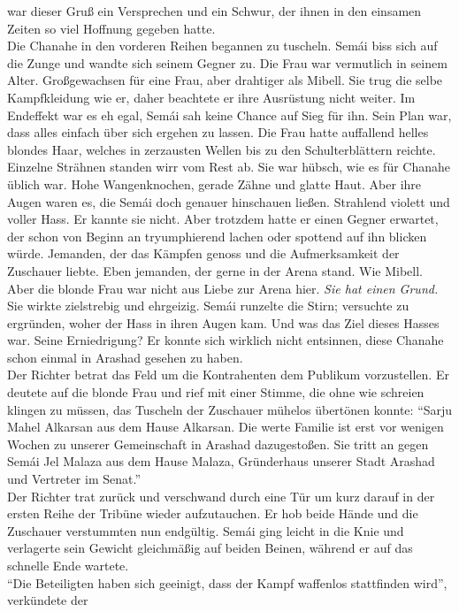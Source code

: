 war dieser Gruß ein Versprechen und ein Schwur, der ihnen in den einsamen Zeiten so viel Hoffnung 
gegeben hatte. \\
Die Chanahe in den vorderen Reihen begannen zu tuscheln. Semái biss sich auf die Zunge und wandte 
sich seinem Gegner zu. Die Frau war vermutlich in seinem Alter. Großgewachsen für eine Frau, aber 
drahtiger als Mibell. Sie trug die selbe Kampfkleidung wie er, daher beachtete er ihre Ausrüstung 
nicht weiter. Im Endeffekt war es eh egal, Semái sah keine Chance auf Sieg für ihn. Sein Plan war, 
dass alles einfach über sich ergehen zu lassen. Die Frau hatte auffallend helles blondes Haar, 
welches in zerzausten Wellen bis zu den Schulterblättern reichte. Einzelne Strähnen standen wirr 
vom Rest ab. Sie war hübsch, wie es für Chanahe üblich war. Hohe Wangenknochen, gerade Zähne und 
glatte Haut. Aber ihre Augen waren es, die Semái doch genauer hinschauen ließen. Strahlend violett 
und voller Hass. Er kannte sie nicht. Aber trotzdem hatte er einen Gegner erwartet, der schon von 
Beginn an tryumphierend lachen oder spottend auf ihn blicken würde. Jemanden, der das Kämpfen 
genoss und die Aufmerksamkeit der Zuschauer liebte. Eben jemanden, der gerne in der Arena stand. 
Wie Mibell. Aber die blonde Frau war nicht aus Liebe zur Arena hier. \textit{Sie hat einen Grund.}\\
Sie wirkte zielstrebig und ehrgeizig. Semái runzelte die Stirn; versuchte zu ergründen, woher der 
Hass in ihren Augen kam. Und was das Ziel dieses Hasses war. Seine Erniedrigung? Er konnte sich 
wirklich nicht entsinnen, diese Chanahe schon einmal in Arashad gesehen zu haben.\\
Der Richter betrat das Feld um die Kontrahenten dem Publikum vorzustellen. Er deutete auf die 
blonde Frau und rief mit einer Stimme, die ohne wie schreien klingen zu müssen, das 
Tuscheln der Zuschauer mühelos übertönen konnte: ``Sarju Mahel Alkarsan aus dem Hause Alkarsan. Die 
werte Familie ist erst vor wenigen Wochen zu unserer Gemeinschaft in Arashad dazugestoßen. Sie 
tritt an gegen Semái Jel Malaza aus dem Hause Malaza, Gründerhaus unserer Stadt Arashad und 
Vertreter im Senat.''\\
Der Richter trat zurück und verschwand durch eine Tür um kurz darauf in der ersten Reihe der 
Tribüne wieder aufzutauchen. Er hob beide Hände und die Zuschauer verstummten nun endgültig. Semái 
ging leicht in die Knie und verlagerte sein Gewicht gleichmäßig auf beiden Beinen, während er auf 
das schnelle Ende wartete.\\
``Die Beteiligten haben sich geeinigt, dass der Kampf waffenlos stattfinden wird'', verkündete der 
